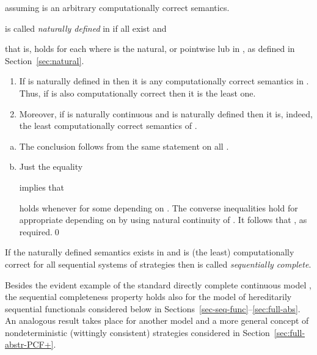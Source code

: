 \documentclass[fleqn]{LMCS}
\theoremstyle{plain}\newtheorem{satz}[thm]{Satz}
\theoremstyle{plain}\newtheorem{hyp}[thm]{Hypothesis}
\theoremstyle{plain}\newtheorem{hyps}[thm]{Hypotheses}
\theoremstyle{definition}\newtheorem{note}[thm]{Note}
\newcommand{\?}{\mbox{?}}
\begin{document}
assuming  is an arbitrary computationally correct semantics. 
\begin{defi}\label{def:natural-defined} is called \emph{naturally defined} in  if 
all  exist and 

that is, 
 holds for each  
where  is the natural, 
or pointwise lub in , as defined in Section~\ref{sec:natural}. 
\end{defi}
\begin{prop}\label{prop:natural-sem}\hfill
\begin{enumerate}[\em(a)]
\item If 
 is naturally defined in  
then it is  any computationally correct semantics in . 
Thus, if  is also computationally correct then it is the least one. 

\item Moreover, 
if  is naturally continuous and  is naturally defined then it 
is, indeed,  
the least computationally correct semantics of .
\end{enumerate}

\end{prop}
\proof \hfill
\begin{enumerate}[(a)]
\item The conclusion follows from the same statement on all . 

\item Just the equality 
 
implies that  
 
holds whenever  for some  depending on .  
The converse inequalities 
 hold 
for appropriate  depending on  by using natural continuity of  . 
It follows that , as required.\qed
\end{enumerate}

\begin{defi}\label{def:sequentially-complete}If the naturally defined semantics  
exists in  and is (the least) computationally correct
for all sequential systems of strategies then  
is called \emph{sequentially complete}. 
\end{defi}

\noindent
Besides the evident example of the standard directly complete 
continuous model , 
the sequential completeness property holds also for 
the model  of hereditarily sequential functionals
considered below in 
Sections~\ref{sec-seq-func}--\ref{sec:full-abs}. 
An analogous result takes place for another model  and a 
more general 
concept of nondeterministic (wittingly consistent)
strategies considered in Section~\ref{sec:full-abstr-PCF+}. 
\end{document}
